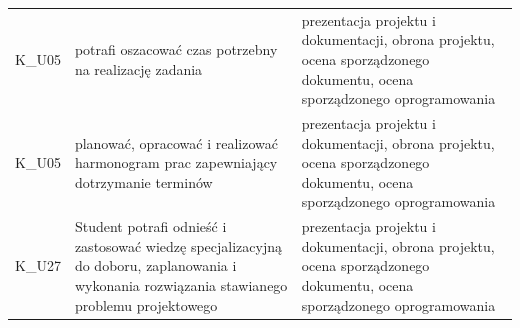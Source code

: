 \documentclass[12pt, a4paper]{article}
\begin{document}
{\begin{longtable}{m{1.6cm}m{9.0cm}m{4.2cm}}
  \rowcolor{tableRowLight} K\_U05 & potrafi oszacować czas potrzebny na realizację zadania & prezentacja projektu i dokumentacji, obrona projektu, ocena sporządzonego dokumentu, ocena sporządzonego oprogramowania \\
  \rowcolor{tableRowAlt} K\_U05 & planować, opracować i realizować harmonogram prac zapewniający dotrzymanie terminów & prezentacja projektu i dokumentacji, obrona projektu, ocena sporządzonego dokumentu, ocena sporządzonego oprogramowania \\
  \rowcolor{tableRowLight} K\_U27 & Student potrafi odnieść i zastosować wiedzę specjalizacyjną do doboru, zaplanowania i wykonania rozwiązania stawianego problemu projektowego & prezentacja projektu i dokumentacji, obrona projektu, ocena sporządzonego dokumentu, ocena sporządzonego oprogramowania \\
\bottomrule
\end{longtable}}
\end{document}
